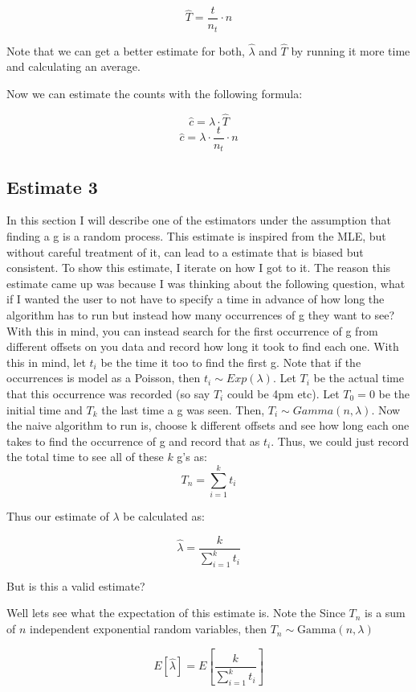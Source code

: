 \documentclass[a4paper]{article}
\begin{document}
$$\hat{T} = \frac{t}{n_t} \cdot n$$

Note that we can get a better estimate for both, $\hat{\lambda}$ and $\hat{T}$ by running it more time and calculating an average.


Now we can estimate the counts with the following formula:

$$\hat{c} = \lambda \cdot \hat{T} $$
$$\hat{c}  = \lambda \cdot \frac{t}{n_t} \cdot n$$

\subsection{Estimate 3}

In this section I will describe one of the estimators under the assumption that finding a g is a random process.
This estimate is inspired from the MLE, but without careful treatment of it, can lead to a estimate that is biased but consistent.
To show this estimate, I iterate on how I got to it.
The reason this estimate came up was because I was thinking about the following question, what if I wanted the user to not have to specify a time in advance of how long the algorithm has to run but instead how many occurrences of g they want to see?
With this in mind, you can instead search for the first occurrence of g from different offsets on you data and record how long it took to find each one.
With this in mind, let $t_i$ be the time it too to find the first g.
Note that if the occurrences is model as a Poisson, then $t_i \sim Exp(\lambda)$.
Let $T_i$ be the actual time that this occurrence was recorded (so say $T_i$ could be 4pm etc).
Let $T_0 = 0$ be the initial time and $T_k$ the last time a g was seen.
Then, $T_i \sim Gamma(n, \lambda)$.
Now the naive algorithm to run is, choose k different offsets and see how long each one takes to find the occurrence of g and record that as $t_i$.
Thus, we could just record the total time to see all of these $k$ g's as: 
$$ T_n = \sum^{k}_{i=1} t_i$$

Thus our estimate of $\lambda$ be calculated as:

$$\hat{\lambda} = \frac{k}{\sum^{k}_{i=1} t_i}$$

But is this a valid estimate?

Well lets see what the expectation of this estimate is.
Note the Since $T_n$ is a sum of $n$ independent exponential random variables, then $T_n\sim\mathrm{Gamma}(n,\lambda)$

$$E[\hat{\lambda}] = E[ \frac{k}{ \sum^{k}_{i=1} t_i } ]$$
\end{document}
